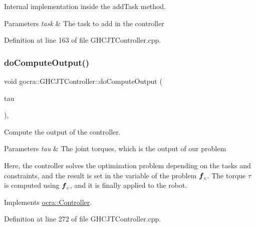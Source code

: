 Internal implementation inside the add\+Task method.


\begin{DoxyParams}{Parameters}
{\em task} & The task to add in the controller \\
\hline
\end{DoxyParams}


Definition at line 163 of file G\+H\+C\+J\+T\+Controller.\+cpp.

\hypertarget{classgocra_1_1GHCJTController_a0f2412763e005e9e18b9129e460411bd}{}\label{classgocra_1_1GHCJTController_a0f2412763e005e9e18b9129e460411bd} 
\subsubsection{\texorpdfstring{do\+Compute\+Output()}{doComputeOutput()}}
{\footnotesize\ttfamily void gocra\+::\+G\+H\+C\+J\+T\+Controller\+::do\+Compute\+Output (\begin{DoxyParamCaption}\item[{Eigen\+::\+Vector\+Xd \&}]{tau }\end{DoxyParamCaption})\hspace{0.3cm}{\ttfamily [protected]}, {\ttfamily [virtual]}}

Compute the output of the controller.


\begin{DoxyParams}{Parameters}
{\em tau} & The joint torques, which is the output of our problem\\
\hline
\end{DoxyParams}
Here, the controller solves the optimization problem depending on the tasks and constraints, and the result is set in the variable of the problem $ \mbox{\boldmath${f}$}_c $. The torque $ \tau $ is computed using $ \mbox{\boldmath${f}$}_c $, and it is finally applied to the robot. 

Implements \hyperlink{classocra_1_1Controller_a8ca85413067d948459afa5981b3dda32}{ocra\+::\+Controller}.



Definition at line 272 of file G\+H\+C\+J\+T\+Controller.\+cpp.

\hypertarget{classgocra_1_1GHCJTController_a2bee2520ee73a43496cf155eb1c77548}{}\label{classgocra_1_1GHCJTController_a2bee2520ee73a43496cf155eb1c77548} 
